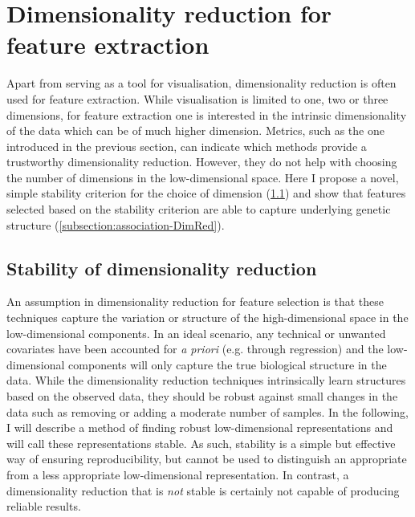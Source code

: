 \section{Dimensionality reduction for feature extraction}
Apart from serving as a tool for visualisation, dimensionality reduction is often used for feature extraction. While visualisation is limited to one, two or three dimensions, for feature extraction one is interested in the intrinsic dimensionality of the data which can be of much higher dimension. Metrics, such as the one introduced in the previous section, can indicate which methods provide a trustworthy dimensionality reduction. However, they do not help with choosing the number of dimensions in the low-dimensional space. Here I propose a novel, simple stability criterion for the choice of dimension (\cref{subsection:stability-DimRed}) and show that features selected based on the stability criterion are able to capture underlying genetic structure (\cref{subsection:association-DimRed}).

\subsection{Stability of dimensionality reduction}
\label{subsection:stability-DimRed}
An assumption in dimensionality reduction for feature selection is that these techniques capture the variation or structure of the high-dimensional space in the low-dimensional components. In an ideal scenario, any technical or unwanted covariates have been accounted for \textit{a priori} (e.g. through regression) and the low-dimensional components will only capture the true biological structure in the data. While the dimensionality reduction techniques intrinsically learn structures based on the observed data, they should be robust against small changes in the data such as removing or adding a moderate number of samples. In the following, I will describe a method of finding robust low-dimensional representations and will call these representations stable.  As such, stability is a simple but effective way of ensuring reproducibility, but cannot be used to distinguish an appropriate from a less appropriate low-dimensional representation. In contrast, a dimensionality reduction that is \textit{not} stable is certainly not capable of producing reliable results.

